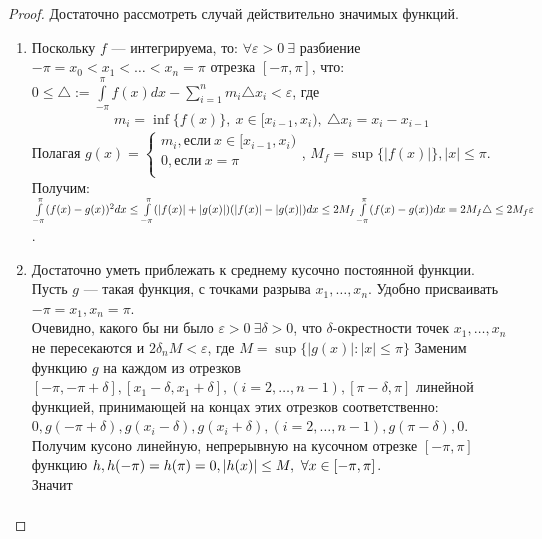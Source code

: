 \begin{proof}
  Достаточно рассмотреть случай действительно значимых функций.
  \begin{enumerate}
    \item Поскольку $f$ --- интегрируема, то: $\forall \varepsilon > 0 \
      \exists$ разбиение $-\pi = x_0 < x_1 < \dots < x_n = \pi$ отрезка $[-\pi,
      \pi]$, что: $0 \leq \triangle := \int\limits_{-\pi}^\pi f(x) dx -
      \sum\limits_{i = 1}^{n} m_i \triangle x_i < \varepsilon$, где
      \begin{gather*}
        m_i = \inf\{f(x)\}, \ x \in [x_{i-1}, x_i), \ \triangle x_i = x_i - x_{i-1}
      \end{gather*}
      Полагая
        $g(x) =
        \begin{cases}
          m_i, \text{если} \ x \in [x_{i-1}, x_i) \\
          0, \text{если} \ x = \pi \\
        \end{cases} $,
      $M_f = \sup\{|f(x)|\}, |x| \leq \pi$. \\
      Получим:
        $\int\limits_{-\pi}^\pi (f(x) - g(x))^2 dx \leq \int\limits_{-\pi}^\pi
        (|f(x)| + |g(x)|) (|f(x)| - |g(x)|) dx \leq \\
        2M_f \int\limits_{-\pi}^\pi
        (f(x) - g(x)) dx = 2M_f\triangle \leq 2M_f \varepsilon$.
      \item Достаточно уметь приблежать к среднему кусочно постоянной функции.
        Пусть $g$ --- такая функция, с точками разрыва $x_1, \dots, x_n$.
        Удобно присваивать $-\pi = x_1, x_n = \pi$. \\
        Очевидно, какого бы ни было $\varepsilon > 0 \ \exists \delta > 0$, что
        $\delta$-окрестности точек $x_1, \dots, x_n$ не пересекаются и
        $2\delta_n M < \varepsilon$, где $M = \sup \{|g(x)| : |x| \leq \pi\}$
        Заменим функцию $g$ на каждом из отрезков $[-\pi, -\pi + \delta], [x_1
        -\delta, x_1 + \delta], (i = 2, \dots, n-1), [\pi - \delta, \pi]$
        линейной функцией, принимающей на концах этих отрезков соответственно: \\
        $0, g(-\pi + \delta), g(x_i - \delta), g(x_i + \delta), (i = 2, \dots,
        n - 1), g(\pi - \delta), 0$. Получим кусоно линейную, непрерывную на
        кусочном отрезке $[-\pi, \pi]$ функцию $h, h(-\pi) = h(\pi) = 0, \\
        |h(x)| \leq M, \ \forall x \in [-\pi, \pi]$. \\
        Значит
        \begin{gather}

\end{gather}
\end{enumerate}
\end{proof}
